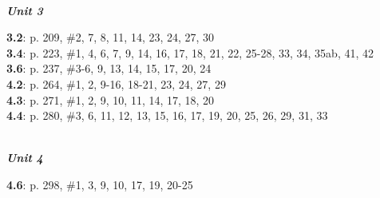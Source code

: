 \documentclass[notes]{subfiles}
\begin{document}
	\hrulefill \\
	\textit{\textbf{Unit 3}}\\
	\begin{flushleft}
		\textbf{3.2}: p. 209, \#2, 7, 8, 11, 14, 23, 24, 27, 30\\
		\textbf{3.4}: p. 223, \#1, 4, 6, 7, 9, 14, 16, 17, 18, 21, 22, 25-28, 33, 34, 35ab, 41, 42\\
		\textbf{3.6}: p. 237, \#3-6, 9, 13, 14, 15, 17, 20, 24\\
		\textbf{4.2}: p. 264, \#1, 2, 9-16, 18-21, 23, 24, 27, 29\\
		\textbf{4.3}: p. 271, \#1, 2, 9, 10, 11, 14, 17, 18, 20\\
		\textbf{4.4}: p. 280, \#3, 6, 11, 12, 13, 15, 16, 17, 19, 20, 25, 26, 29, 31, 33\\
	\end{flushleft}
	
	\hrulefill \\
	\textit{\textbf{Unit 4}}\\
	\begin{flushleft}
		\textbf{4.6}: p. 298, \#1, 3, 9, 10, 17, 19, 20-25
	\end{flushleft}
	\hrulefill
\end{document}
